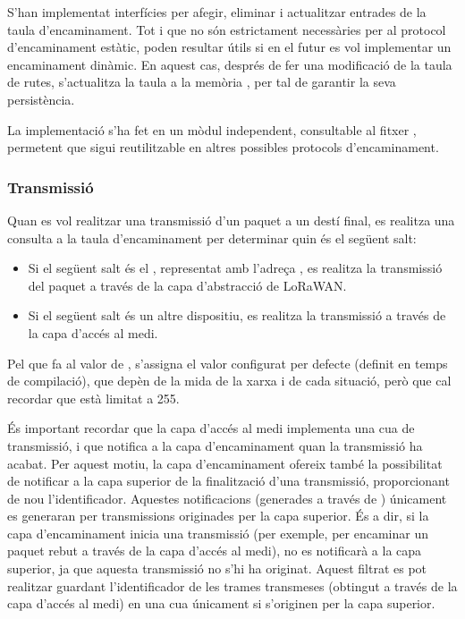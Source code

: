 \documentclass{tfgitic}[2024/07/01]
\begin{document}
{S’han implementat interfícies per afegir, eliminar i actualitzar entrades de la taula d’encaminament. Tot i que no són estrictament necessàries per al protocol d’encaminament estàtic, poden resultar útils si en el futur es vol implementar un encaminament dinàmic. En aquest cas, després de fer una modificació de la taula de rutes, s'actualitza la taula a la memòria , per tal de garantir la seva persistència.

La implementació s'ha fet en un mòdul independent, consultable al fitxer , permetent que sigui reutilitzable en altres possibles protocols d'encaminament.
\subsubsection{Transmissió}
\label{subsubsec:routing_tx}
Quan es vol realitzar una transmissió d'un paquet a un destí final, es realitza una consulta a la taula d'encaminament per determinar quin és el següent salt:
\begin{itemize}
    \item Si el següent salt és el , representat amb l'adreça , es realitza la transmissió del paquet a través de la capa d'abstracció de LoRaWAN.
    \item Si el següent salt és un altre dispositiu, es realitza la transmissió a través de la capa d'accés al medi.
\end{itemize}

Pel que fa al valor de , s'assigna el valor configurat per defecte (definit en temps de compilació), que depèn de la mida de la xarxa i de cada situació, però que cal recordar que està limitat a 255.

És important recordar que la capa d'accés al medi implementa una cua de transmissió, i que notifica a la capa d'encaminament quan la transmissió ha acabat. Per aquest motiu, la capa d'encaminament ofereix també la possibilitat de notificar a la capa superior de la finalització d'una transmissió, proporcionant de nou l'identificador. Aquestes notificacions (generades a través de ) únicament es generaran per transmissions originades per la capa superior. És a dir, si la capa d'encaminament inicia una transmissió (per exemple, per encaminar un paquet rebut a través de la capa d'accés al medi), no es notificarà a la capa superior, ja que aquesta transmissió no s'hi ha originat. Aquest filtrat es pot realitzar guardant l'identificador de les trames transmeses (obtingut a través de la capa d'accés al medi) en una cua únicament si s'originen per la capa superior.

}
\end{document}
